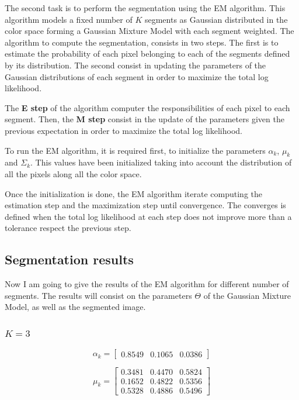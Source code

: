 \documentclass{ethz_report}
\begin{document}
The second task is to perform the segmentation using the EM algorithm.
This algorithm models a fixed number of $K$ segments as Gaussian distributed in the color space forming a Gaussian Mixture Model with each segment weighted.
The algorithm to compute the segmentation, consists in two steps.
The first is to estimate the probability of each pixel belonging to each of the segments defined by its distribution.
The second consist in updating the parameters of the Gaussian distributions of each segment in order to maximize the total log likelihood.

The \textbf{E step} of the algorithm computer the responsibilities of each pixel to each segment.
Then, the \textbf{M step} consist in the update of the parameters given the previous expectation in order to maximize the total log likelihood.

To run the EM algorithm, it is required first, to initialize the parameters $\alpha_k$, $\mu_k$ and $\Sigma_k$. This values have been initialized taking into account the distribution of all the pixels along all the color space.

Once the initialization is done, the EM algorithm iterate computing the estimation step and the maximization step until convergence.
The converges is defined when the total log likelihood at each step does not improve more than a tolerance respect the previous step.

\subsection*{Segmentation results}

Now I am going to give the results of the EM algorithm for different number of segments. The results will consist on the parameters $\Theta$ of the Gaussian Mixture Model, as well as the segmented image.

\subsubsection*{$K=3$}

\begin{equation}
    \alpha_k = \begin{bmatrix}
        0.8549 & 0.1065 & 0.0386
    \end{bmatrix}
\end{equation}

\begin{equation}
    \mu_k = \begin{bmatrix}
        0.3481  &  0.4470  &  0.5824 \\
        0.1652  &  0.4822  &  0.5356 \\
        0.5328  &  0.4886  &  0.5496
    \end{bmatrix}
\end{equation}
\end{document}
